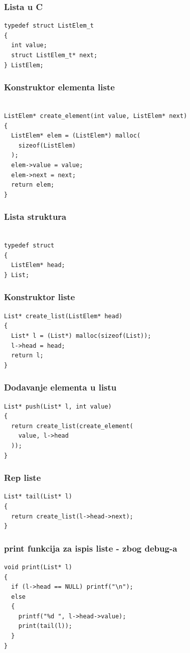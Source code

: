 \documentclass{beamer}
\begin{document}
\begin{frame}[fragile]
  \frametitle{Lista u C}
  \begin{lstlisting}
typedef struct ListElem_t
{
  int value;
  struct ListElem_t* next;
} ListElem;
  \end{lstlisting}
\end{frame}

\begin{frame}[fragile]
  \frametitle{Konstruktor elementa liste}
  \begin{lstlisting}

ListElem* create_element(int value, ListElem* next)
{
  ListElem* elem = (ListElem*) malloc(
    sizeof(ListElem)
  );
  elem->value = value;
  elem->next = next;
  return elem;
}

  \end{lstlisting}
\end{frame}


\begin{frame}[fragile]
  \frametitle{Lista struktura}
  \begin{lstlisting}

typedef struct
{
  ListElem* head;
} List;

  \end{lstlisting}
\end{frame}

\begin{frame}[fragile]
  \frametitle{Konstruktor liste}
  \begin{lstlisting}
List* create_list(ListElem* head)
{
  List* l = (List*) malloc(sizeof(List));
  l->head = head;
  return l;
}
  \end{lstlisting}
\end{frame}


\begin{frame}[fragile]
  \frametitle{Dodavanje elementa u listu}
  \begin{lstlisting}
List* push(List* l, int value)
{
  return create_list(create_element(
    value, l->head
  ));
}
  \end{lstlisting}
\end{frame}

\begin{frame}[fragile]
  \frametitle{Rep liste}
  \begin{lstlisting}
List* tail(List* l)
{
  return create_list(l->head->next);
}
  \end{lstlisting}
\end{frame}


\begin{frame}[fragile]
  \frametitle{print funkcija za ispis liste - zbog debug-a}
  \begin{lstlisting}
void print(List* l)
{
  if (l->head == NULL) printf("\n");
  else
  {
    printf("%d ", l->head->value);
    print(tail(l));
  }
}
  \end{lstlisting}
\end{frame}
\end{document}

